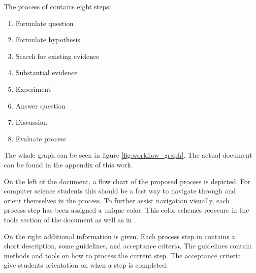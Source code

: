 \begin{minipage}{\linewidth}
The process of \checklist contains eight steps:
\begin{enumerate}
\item Formulate question
\item Formulate hypothesis
\item Search for existing evidence
\item Substantial evidence
\item Experiment
\item Answer question
\item Discussion
\item Evaluate process
\end{enumerate}


The whole graph can be seen in figure \ref{fig:workflow_graph}. The actual document can be found in the appendix of this work.

On the left of the document, a flow chart of the proposed process is depicted. For computer science students this should be a fast way to navigate through and orient themselves in the process. To further assist navigation visually, each process step has been assigned a unique color. This color schemes reoccurs in the tools section of the document as well as in \briefingform.

On the right additional information is given. Each process step in \checklist contains a short description, some guidelines, and acceptance criteria. The guidelines contain methods and tools on how to process the current step. The acceptance criteria give students orientation on when a step is completed.
\end{minipage}









